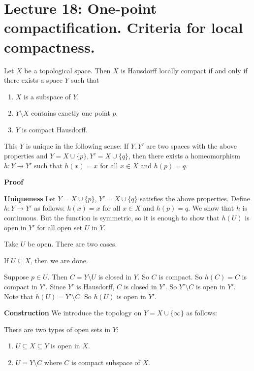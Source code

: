 \documentclass[main.tex]{subfiles}
\begin{document}
\pagestyle{plain}
\setcounter{chapter}{17}

\chapter{Lecture 18: One-point compactification. Criteria for local compactness. }
\label{chap:chapter18}

\begin{theorem}\label{thm:17.0.1}
    Let $X$ be a topological space. Then $X$ is Hausdorff locally compact if and only if there exists a space $Y$ such that
    \begin{enumerate}
        \item $X$ is a subspace of $Y$.
        \item $Y \setminus X$ contains exactly one point $p$.
        \item $Y$ is compact Hausdorff. 
    \end{enumerate}
    This $Y$ is unique in the following sense: If $Y, Y'$ are two spaces with the above properties and $Y = X \cup \{p\}, Y' = X \cup \{q\}$, then there exists a homeomorphism $h: Y \to Y'$ such that $h(x) = x$ for all $x \in X$ and $h(p) = q$.
\end{theorem}
\par \noindent \textbf{Proof} 
\par \noindent \textbf{Uniqueness} Let $Y = X \cup \{p\}$, $Y' = X \cup \{q\}$ satisfies the above properties. Define $h: Y \to Y'$ as follows: $h(x) = x$ for all $x \in X$ and $h(p) = q$. We show that $h$ is continuous. But the function is symmetric, so it is enough to show that $h(U)$ is open in $Y'$ for all open set $U$ in $Y$. 
\par Take $U$ be open. There are two cases. 
\par If $U \subseteq X$, then we are done. 
\par Suppose $p\in U$. Then $C = Y \setminus U$ is closed in $Y$. So $C$ is compact. So $h(C) = C$ is compact in $Y'$. Since $Y'$ is Hausdorff, $C$ is closed in $Y'$. So $Y' \setminus C$ is open in $Y'$. Note that $h(U) = Y' \setminus C$. So $h(U)$ is open in $Y'$. 
\par \noindent \textbf{Construction} We introduce the topology on $Y = X \cup \{\infty\}$ as follows: 
\par There are two types of open sets in $Y$: 
\begin{enumerate}
    \item $U \subseteq X \subseteq Y$ is open in $X$.
    \item $U = Y \setminus C$ where $C$ is compact subspace of $X$. 
\end{enumerate}
\end{document}
